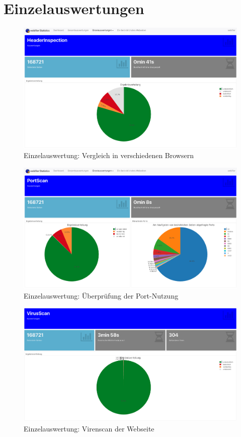 \section{Einzelauswertungen}
\begin{figure}[H]
  \centering
  \includegraphics[width=15cm]{images/stats/headerinspection}
  \caption{Einzelauswertung: Vergleich in verschiedenen Browsern}
  \label{fig:headerinspection}
\end{figure}


\begin{figure}[H]
  \centering
  \includegraphics[width=15cm]{images/stats/portscan}
  \caption{Einzelauswertung: Überprüfung der Port-Nutzung}
  \label{fig:virenscan}
\end{figure}


\begin{figure}[H]
  \centering
  \includegraphics[width=15cm]{images/stats/virusscan}
  \caption{Einzelauswertung: Virenscan der Webseite}
  \label{fig:virusscan}
\end{figure}

